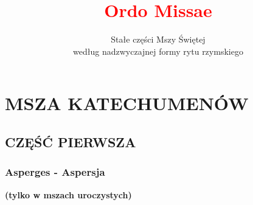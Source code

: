 \documentclass[10pt,titlepage]{article}
\title{\textcolor{red}{Ordo Missae}}
\author{Stałe części Mszy Świętej\\według nadzwyczajnej formy rytu rzymskiego }
\date{}
\begin{document}
	\maketitle
	\clearpage
	\tableofcontents
	\clearpage
	
	\section{MSZA KATECHUMENÓW}
	
	\subsection{CZĘŚĆ PIERWSZA}
	
	\subsubsection{Asperges - Aspersja}
	\textbf{(tylko w mszach uroczystych)}
	
\end{document}
